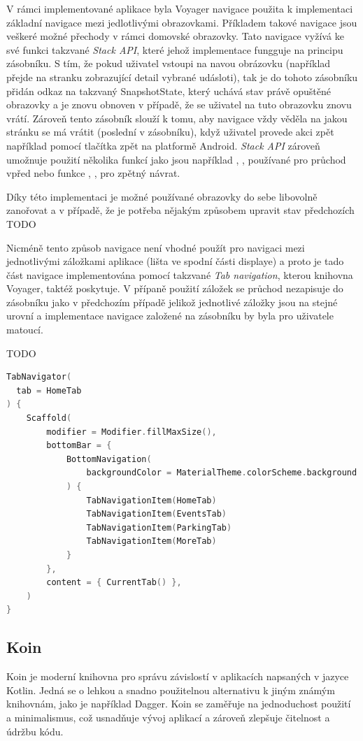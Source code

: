  V rámci implementované aplikace byla Voyager navigace použita k implementaci základní navigace mezi jedlotlivými obrazovkami.
 Příkladem takové navigace jsou veškeré možné přechody v rámci domovské obrazovky. Tato navigace vyžívá ke své funkci takzvané 
 \textit{Stack API}, které jehož implementace fungguje na principu zásobníku. S tím, že pokud uživatel vstoupi na navou obrázovku 
 (například přejde na stranku zobrazující detail vybrané udásloti), tak je do tohoto zásobníku přidán odkaz na takzvaný SnapshotState,
 který uchává stav právě opuštěné obrazovky a je znovu obnoven v případě, že se uživatel na tuto obrazovku znovu vrátí. Zároveň tento
 zásobník slouží k tomu, aby navigace vždy věděla na jakou stránku se má vrátit (poslední v zásobníku), když uživatel provede akci zpět
 například pomocí tlačítka zpět na platformě Android. \textit{Stack API} zároveň umožnuje použití několika funkcí jako jsou například 
 , ,  používané pro průchod vpřed nebo funkce , , 
  pro zpětný návrat. 

 Díky této implementaci je možné používané obrazovky do sebe libovolně zanořovat a v případě, že je potřeba nějakým způsobem upravit
 stav předchozích TODO

 Nicméně tento způsob navigace není vhodné použít pro navigaci mezi jednotlivými záložkami aplikace (lišta ve spodní části displaye) 
 a proto je tado část navigace 
 implementována pomocí takzvané \textit{Tab navigation}, kterou knihovna Voyager, taktéž poskytuje. V přípaně použití záložek se
 průchod nezapisuje do zásobníku jako v předchozím případě jelikož jednotlivé záložky jsou na stejné urovní a implementace navigace
 založené na zásobníku by byla pro uživatele matoucí.

 TODO
 \begin{lstlisting}[caption={Ukázka použití navigace založené na záložkách}, label={lst:tabNav}, language=Kotlin]
TabNavigator(
  tab = HomeTab
) {
    Scaffold(
        modifier = Modifier.fillMaxSize(),
        bottomBar = {
            BottomNavigation(
                backgroundColor = MaterialTheme.colorScheme.background
            ) {
                TabNavigationItem(HomeTab)
                TabNavigationItem(EventsTab)
                TabNavigationItem(ParkingTab)
                TabNavigationItem(MoreTab)
            }
        },
        content = { CurrentTab() },
    )
}
\end{lstlisting}

\subsection{Koin}
Koin je moderní knihovna pro správu závislostí v aplikacích napsaných v jazyce Kotlin. Jedná se o lehkou a snadno použitelnou alternativu 
k jiným známým knihovnám, jako je například Dagger. Koin se zaměřuje na jednoduchost použití a minimalismus, což usnadňuje vývoj aplikací 
a zároveň zlepšuje čitelnost a údržbu kódu.

